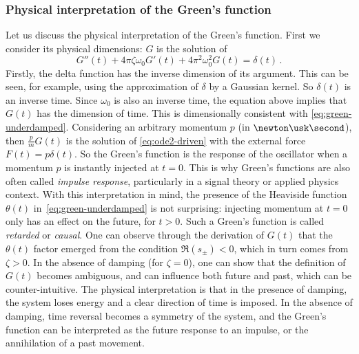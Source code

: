 \subsubsection{Physical interpretation of the Green's function}
Let us discuss the physical interpretation of the Green's function. First we consider its
physical dimensions: $G$ is the solution of
\begin{equation}
  G''(t)+4\pi\zeta\omega_0 G'(t)+4\pi^2\omega_0^2G(t)=\delta(t)\,.
\end{equation}
Firstly, the delta function has the inverse dimension of its argument. This can be seen,
for example, using the approximation of $\delta$ by a Gaussian kernel. So $\delta(t)$ is
an inverse time. Since $\omega_0$ is also an inverse time, the equation above implies that
$G(t)$ has the dimension of time. This is dimensionally consistent with
\cref{eq:green-underdamped}. Considering an arbitrary momentum $p$ (in
$\newton\usk\second$), then $\frac{p}{m}G(t)$ is the solution of \cref{eq:ode2-driven}
with the external force $F(t)=p\delta(t)$. So the Green's function is the response of the
oscillator when a momentum $p$ is instantly injected at $t=0$. This is why Green's functions
are also often called \emph{impulse response}, particularly in a signal theory or applied
physics context. With this interpretation in mind, the presence of the Heaviside function
$\theta(t)$ in~\cref{eq:green-underdamped} is not surprising: injecting momentum at $t=0$
only has an effect on the future, \ie for $t>0$. Such a Green's function is called
\emph{retarded} or \emph{causal}. One can observe through the derivation of $G(t)$ that
the $\theta(t)$ factor emerged from the condition $\Re(s_{\pm})<0$, which in turn comes
from $\zeta>0$. In the absence of damping (\ie for $\zeta=0$), one can show that the
definition of $G(t)$ becomes ambiguous, and can influence both future and past, which can
be counter-intuitive. The physical interpretation is that in the presence of damping, the
system loses energy and a clear direction of time is imposed. In the absence of damping,
time reversal becomes a symmetry of the system, and the Green's function can be
interpreted as the future response to an impulse, or the annihilation of a past movement.

